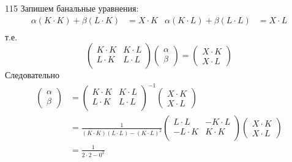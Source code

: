 \documentclass[12pt,a4paper]{article}
\begin{document}
\begin{problem}{115}
        Запишем банальные уравнения:
        \begin{align*}
            \alpha (K \cdot K) + \beta (L \cdot K) &= X \cdot K&
            \alpha (K \cdot L) + \beta (L \cdot L) &= X \cdot L\\
        \end{align*}
        т.е.
        \[
            \begin{pmatrix}
                K \cdot K& K \cdot L\\
                L \cdot K& L \cdot L\\
            \end{pmatrix}
            \begin{pmatrix}
                \alpha\\ \beta
            \end{pmatrix}
            = \begin{pmatrix}
                X \cdot K\\
                X \cdot L
            \end{pmatrix}
        \]
        Следовательно
        \begin{align*}
            \begin{pmatrix}
                \alpha\\ \beta
            \end{pmatrix}
            &=
            \begin{pmatrix}
                K \cdot K& K \cdot L\\
                L \cdot K& L \cdot L\\
            \end{pmatrix}^{-1}
            \begin{pmatrix}
                X \cdot K\\
                X \cdot L
            \end{pmatrix}\\
            &=\frac{1}{(K \cdot K)(L \cdot L) - (K \cdot L)^2}
            \begin{pmatrix}
                L \cdot L& -K \cdot L\\
                -L \cdot K& K \cdot K\\
            \end{pmatrix}
            \begin{pmatrix}
                X \cdot K\\
                X \cdot L
            \end{pmatrix}\\
            &=\frac{1}{2 \cdot 2 - 0^2}

\end{align*}
\end{problem}
\end{document}
